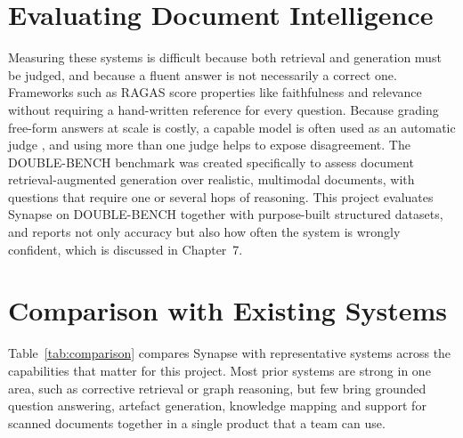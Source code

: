 \section{Evaluating Document Intelligence}

Measuring these systems is difficult because both retrieval and generation must
be judged, and because a fluent answer is not necessarily a correct one.
Frameworks such as RAGAS \cite{es2024ragas} score properties like faithfulness
and relevance without requiring a hand-written reference for every question.
Because grading free-form answers at scale is costly, a capable model is often
used as an automatic judge \cite{zheng2023judge}, and using more than one judge
helps to expose disagreement. The DOUBLE-BENCH benchmark \cite{shen2025doublebench}
was created specifically to assess document retrieval-augmented generation over
realistic, multimodal documents, with questions that require one or several hops
of reasoning. This project evaluates Synapse on DOUBLE-BENCH together with
purpose-built structured datasets, and reports not only accuracy but also how
often the system is wrongly confident, which is discussed in Chapter~7.

\section{Comparison with Existing Systems}

Table~\ref{tab:comparison} compares Synapse with representative systems across
the capabilities that matter for this project. Most prior systems are strong in
one area, such as corrective retrieval or graph reasoning, but few bring grounded
question answering, artefact generation, knowledge mapping and support for
scanned documents together in a single product that a team can use.

